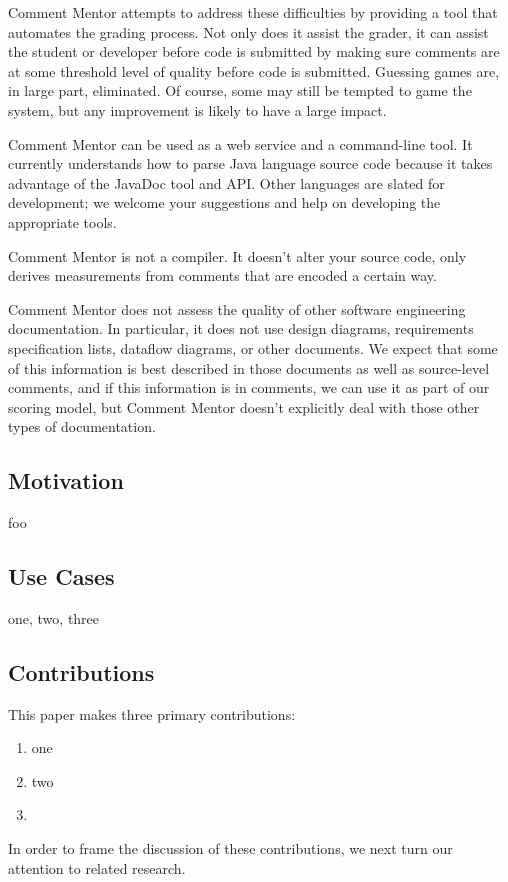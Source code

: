 Comment Mentor attempts to address these difficulties by providing a
tool that automates the grading process. Not only does it assist the
grader, it can assist the student or developer before code is
submitted by making sure comments are at some threshold level of
quality before code is submitted. Guessing games are, in large part,
eliminated. Of course, some may still be tempted to game the system,
but any improvement is likely to have a large impact.

Comment Mentor can be used as a web service and a command-line
tool. It currently understands how to parse Java language source code
because it takes advantage of the JavaDoc tool and API. Other
languages are slated for development; we welcome your suggestions and
help on developing the appropriate tools.

Comment Mentor is not a compiler. It doesn't alter your source code,
only derives measurements from comments that are encoded a certain
way.

Comment Mentor does not assess the quality of other software
engineering documentation. In particular, it does not use design
diagrams, requirements specification lists, dataflow diagrams, or
other documents. We expect that some of this information is best
described in those documents as well as source-level comments, and if
this information is in comments, we can use it as part of our scoring
model, but Comment Mentor doesn't explicitly deal with those other
types of documentation.

\subsection{Motivation}

foo

\subsection{Use Cases}

one, two, three

\subsection{Contributions}

This paper makes three primary contributions:

\begin{enumerate}

  \item  one

  \item two

 \item 
\end{enumerate}

In order to frame the discussion of these contributions, we next turn our
attention to related research.
